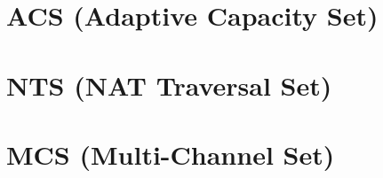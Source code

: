\section{ACS (Adaptive Capacity Set)}


\section{NTS (NAT Traversal Set)}


\section{MCS (Multi-Channel Set)}


\begin{comment}

\end{comment}


